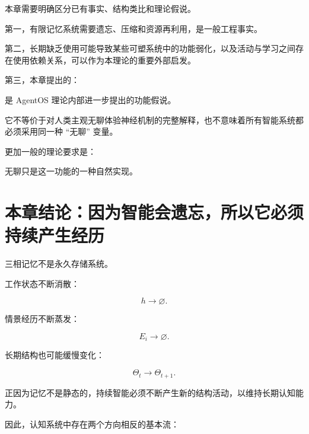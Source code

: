 本章需要明确区分已有事实、结构类比和理论假说。

第一，有限记忆系统需要遗忘、压缩和资源再利用，是一般工程事实。

第二，长期缺乏使用可能导致某些可塑系统中的功能弱化，以及活动与学习之间存在使用依赖关系，可以作为本理论的重要外部启发。

第三，本章提出的：

\begin{statementbox}
\centering
{}
\end{statementbox}

是 AgentOS 理论内部进一步提出的功能假说。

它不等价于对人类主观无聊体验神经机制的完整解释，也不意味着所有智能系统都必须采用同一种 ``无聊'' 变量。

更加一般的理论要求是：

\begin{statementbox}
\centering
{}
\end{statementbox}

无聊只是这一功能的一种自然实现。

\section{本章结论：因为智能会遗忘，所以它必须持续产生经历}

三相记忆不是永久存储系统。

工作状态不断消散：

\[
h\rightarrow\varnothing.
\]

情景经历不断蒸发：

\[
E_i\rightarrow\varnothing.
\]

长期结构也可能缓慢变化：

\[
\Theta_t\rightarrow\Theta_{t+1}.
\]

正因为记忆不是静态的，持续智能必须不断产生新的结构活动，以维持长期认知能力。

因此，认知系统中存在两个方向相反的基本流：

\begin{statementbox}
\centering
{}
\end{statementbox}

